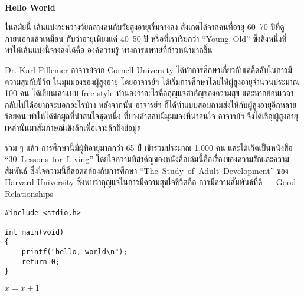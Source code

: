 \documentclass{article}
\begin{document}
\flushleft

\begin{Huge}
\rule{0em}{4ex}\\
\noindent\textbf{%
Hello World}
\vspace{3ex}
\end{Huge}

ในสมัยนี้ เส้นแบ่งระหว่างวัยกลางคนกับวัยสูงอายุเริ่มจางลง สังเกตได้จากคนที่อายุ 60--70 ปีที่ดูภายนอกแล้วเหมือน
กับว่าอายุเพียงแค่ 40--50 ปี หรือที่เราเรียกว่า \mbox{``Young Old''} ซึ่งสิ่งหนึ่งที่ทำให้เส้นแบ่งนี้จางลงได้คือ องค์ความรู้
ทางการแพทย์ที่ก้าวหน้ามากขึ้น

\rule{0em}{1ex}

Dr. Karl Pillemer อาจารย์จาก Cornell University ได้ทำการศึกษาเกี่ยวกับเคล็ดลับในการมีความสุขกับชีวิต
ในมุมมองของผู้สูงอายุ โดยอาจารย์ฯ ได้เริ่มการศึกษาโดยให้ผู้สูงอายุจำนวนประมาณ 100 คน ได้เขียนเล่าแบบ
free-style ทำนองว่าอะไรคือกุญแจสำคัญของความสุข และหากย้อนเวลากลับไปได้อยากจะบอกอะไรบ้าง
หลังจากนั้น อาจารย์ฯ ก็ได้ทำแบบสอบถามส่งให้กับผู้สูงอายุอีกหลายร้อยคน ทำให้ได้ข้อมูลที่น่าสนใจชุดหนึ่ง
ที่บางคำตอบมีมุมมองที่น่าสนใจ อาจารย์ฯ จึงได้เชิญผู้สูงอายุเหล่านั้นมาสัมภาษณ์เชิงลึกเพื่อเจาะลึกถึงข้อมูล

\rule{0em}{1ex}

รวม ๆ แล้ว การศึกษานี้มีผู้ที่อายุมากกว่า 65 ปี เข้าร่วมประมาณ 1,000 คน และได้เกิดเป็นหนังสือ
\mbox{``30 Lessons for Living''} โดยใจความที่สำคัญของหนังสือเล่มนี้คือเรื่องของความรักและความสัมพันธ์
ซึ่งใจความนี้ก็สอดคล้องกับการศึกษา \mbox{``The Study of Adult Development''} ของ Harvard University
ซึ่งพบว่ากุญแจในการมีความสุขใจชีวิตคือ การมีความสัมพันธ์ที่ดี --- Good Relationships

% 

\begin{verbatim}
#include <stdio.h>

int main(void)
{
    printf("hello, world\n");
    return 0;
}
\end{verbatim}

$x = x + 1$
\end{document}
